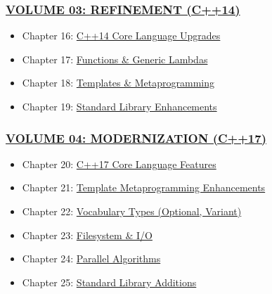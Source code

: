 \hypertarget{volume-03-refinement-c14}{%
\subsubsection{\texorpdfstring{\protect\hyperlink{volume-03-refinement-generics-c14}{VOLUME
03: REFINEMENT
(C++14)}}{VOLUME 03: REFINEMENT (C++14)}}\label{volume-03-refinement-c14}}

\begin{itemize}
\tightlist
\item
  Chapter 16:
  \protect\hyperlink{chapter-16-c14-core-language-upgrades}{C++14 Core
  Language Upgrades}
\item
  Chapter 17:
  \protect\hyperlink{chapter-17-c14-functions-and-lambdas}{Functions \&
  Generic Lambdas}
\item
  Chapter 18:
  \protect\hyperlink{chapter-18-c14-templates-and-metaprogramming}{Templates
  \& Metaprogramming}
\item
  Chapter 19:
  \protect\hyperlink{chapter-19-c14-standard-library-enhancements}{Standard
  Library Enhancements}
\end{itemize}

\hypertarget{volume-04-modernization-c17}{%
\subsubsection{\texorpdfstring{\protect\hyperlink{volume-04-modernization-c17}{VOLUME
04: MODERNIZATION
(C++17)}}{VOLUME 04: MODERNIZATION (C++17)}}\label{volume-04-modernization-c17}}

\begin{itemize}
\tightlist
\item
  Chapter 20:
  \protect\hyperlink{chapter-20-c17-core-language-features}{C++17 Core
  Language Features}
\item
  Chapter 21:
  \protect\hyperlink{chapter-21-c17-template-metaprogramming}{Template
  Metaprogramming Enhancements}
\item
  Chapter 22:
  \protect\hyperlink{chapter-22-c17-vocabulary-types}{Vocabulary Types
  (Optional, Variant)}
\item
  Chapter 23:
  \protect\hyperlink{chapter-23-c17-filesystem-and-io}{Filesystem \&
  I/O}
\item
  Chapter 24:
  \protect\hyperlink{chapter-24-c17-parallel-algorithms-and-concurrency}{Parallel
  Algorithms}
\item
  Chapter 25:
  \protect\hyperlink{chapter-25-c17-standard-library-additions}{Standard
  Library Additions}
\end{itemize}

